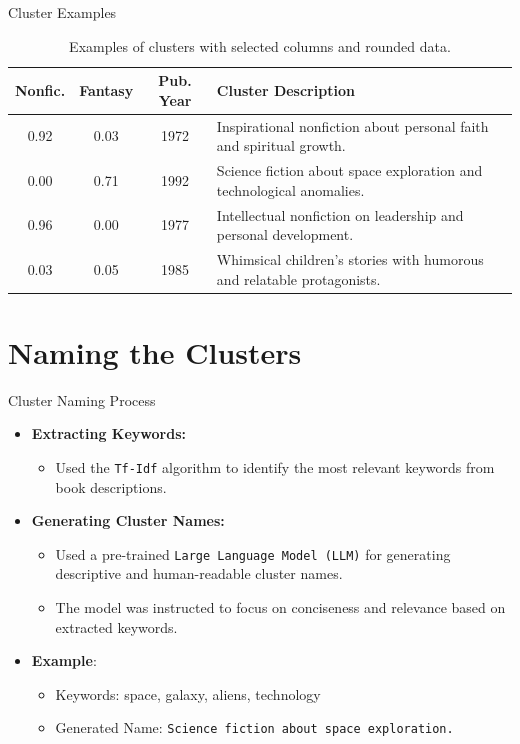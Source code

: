 \documentclass{beamer}
\begin{document}
\begin{frame}{Cluster Examples}
\begin{table}[]
\centering
\begin{tabular}{|c|c|c|p{6cm}|}
\hline
\textbf{Nonfic.} & \textbf{Fantasy} & \textbf{Pub. Year} & \textbf{Cluster Description} \\ \hline
0.92                & 0.03             & 1972                  & Inspirational nonfiction about personal faith and spiritual growth.     \\ \hline
0.00                & 0.71             & 1992                  & Science fiction about space exploration and technological anomalies. \\ \hline
0.96                & 0.00             & 1977                  & Intellectual nonfiction on leadership and personal development. \\ \hline
0.03                & 0.05             & 1985                  & Whimsical children's stories with humorous and relatable protagonists. \\ \hline
\end{tabular}
\caption{Examples of clusters with selected columns and rounded data.}
\end{table}
\end{frame}

\section{Naming the Clusters}
\begin{frame}{Cluster Naming Process}
    \begin{itemize}
        \item \textbf{Extracting Keywords:}
            \begin{itemize}
                \item Used the \texttt{Tf-Idf} algorithm to identify the most relevant keywords from book descriptions.
            \end{itemize}
        \item \textbf{Generating Cluster Names:}
            \begin{itemize}
                \item Used a pre-trained \texttt{Large Language Model (LLM)} for generating descriptive and human-readable cluster names.
                \item The model was instructed to focus on conciseness and relevance based on extracted keywords.
            \end{itemize}
        \item \textbf{Example}:
            \begin{itemize}
                \item Keywords: space, galaxy, aliens, technology
                \item Generated Name: \texttt{Science fiction about space exploration.}
            \end{itemize}
    \end{itemize}
\end{frame}
\end{document}
